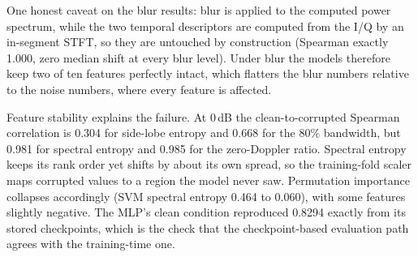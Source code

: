 \documentclass[conference]{IEEEtran}
\begin{document}
One honest caveat on the blur results: blur is applied to the computed power spectrum, while the two temporal descriptors are computed from the I/Q by an in-segment STFT, so they are untouched by construction (Spearman exactly 1.000, zero median shift at every blur level). Under blur the models therefore keep two of ten features perfectly intact, which flatters the blur numbers relative to the noise numbers, where every feature is affected.

Feature stability explains the failure. At 0\,dB the clean-to-corrupted Spearman correlation is 0.304 for side-lobe entropy and 0.668 for the 80\% bandwidth, but 0.981 for spectral entropy and 0.985 for the zero-Doppler ratio. Spectral entropy keeps its rank order yet shifts by about its own spread, so the training-fold scaler maps corrupted values to a region the model never saw. Permutation importance collapses accordingly (SVM spectral entropy 0.464 to 0.060), with some features slightly negative. The MLP's clean condition reproduced 0.8294 exactly from its stored checkpoints, which is the check that the checkpoint-based evaluation path agrees with the training-time one.
\end{document}
